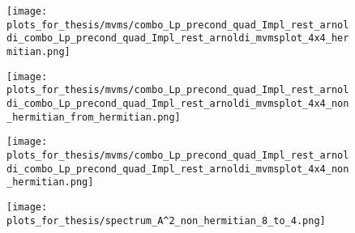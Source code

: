 \begin{figure}[H]
    \centering
    \begin{minipage}{0.45\textwidth}
        \centering
        \texttt{[image: plots\_for\_thesis/mvms/combo\_Lp\_precond\_quad\_Impl\_rest\_arnoldi\_combo\_Lp\_precond\_quad\_Impl\_rest\_arnoldi\_mvmsplot\_4x4\_hermitian.png]} %
    \end{minipage}%
    \hspace{0.02\textwidth} %
    \begin{minipage}{0.45\textwidth}
        \centering
        \texttt{[image: plots\_for\_thesis/mvms/combo\_Lp\_precond\_quad\_Impl\_rest\_arnoldi\_combo\_Lp\_precond\_quad\_Impl\_rest\_arnoldi\_mvmsplot\_4x4\_non\_hermitian\_from\_hermitian.png]} %
    \end{minipage}
    
    \vspace{0.02\textwidth} %
    
    \begin{minipage}{0.45\textwidth}
        \centering
        \texttt{[image: plots\_for\_thesis/mvms/combo\_Lp\_precond\_quad\_Impl\_rest\_arnoldi\_combo\_Lp\_precond\_quad\_Impl\_rest\_arnoldi\_mvmsplot\_4x4\_non\_hermitian.png]} %
    \end{minipage}%
    \hspace{0.02\textwidth} %
    \begin{minipage}{0.45\textwidth}
        \centering
        \texttt{[image: plots\_for\_thesis/spectrum\_A^2\_non\_hermitian\_8\_to\_4.png]} %
    \end{minipage}
    

\end{figure}
